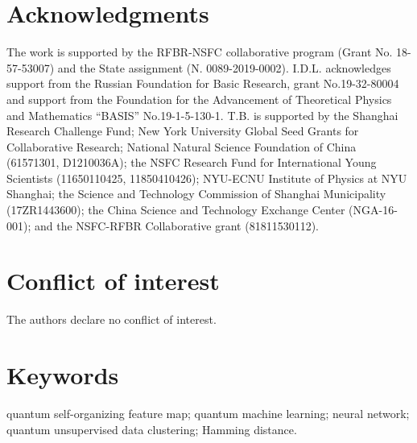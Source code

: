 \documentclass[pra,showkeys,twocolumn,showpacs]{revtex4-1}
\begin{document}
\section*{Acknowledgments}
The work is supported by the RFBR-NSFC collaborative program (Grant No. 18-57-53007) and the State assignment (N. 0089-2019-0002). I.D.L. acknowledges support from the Russian Foundation for Basic Research, grant No.19-32-80004 and support from the Foundation for the Advancement of Theoretical Physics and Mathematics “BASIS” No.19-1-5-130-1. T.B. is supported by the Shanghai Research Challenge Fund; New York University Global Seed Grants for Collaborative Research; National Natural Science Foundation of China (61571301, D1210036A); the NSFC Research Fund for International Young Scientists (11650110425, 11850410426); NYU-ECNU Institute of Physics at NYU Shanghai; the Science and Technology Commission of Shanghai Municipality (17ZR1443600); the China Science and Technology Exchange Center (NGA-16-001); and the NSFC-RFBR Collaborative grant (81811530112).











\section*{Conflict of interest}

The authors declare no conflict of interest.


\section*{Keywords}
quantum self-organizing feature map; quantum machine learning; neural network; quantum unsupervised data clustering; Hamming distance.



\end{document}

